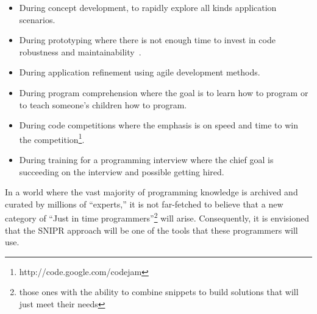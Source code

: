 \begin{itemize}
\item During concept development, to rapidly explore all kinds application scenarios.
\item During prototyping where there is not enough time to invest in 
    code robustness and maintainability~\cite{Brandt:2008wi, Ncube:2008fm, Brandt:2009jb}. 
\item During application refinement using agile development methods. 
\item During program comprehension where the goal is to learn how to program or 
    to teach someone's children how to program.  
\item During code competitions where the emphasis is on speed and time to win 
    the competition\footnote{http://code.google.com/codejam}.
\item During training for a programming interview where the chief goal is succeeding on the 
    interview and possible getting hired.
\end{itemize}

In a world where the vast majority of programming knowledge is archived and curated by millions of ``experts,'' it is not far-fetched to believe that a new category of ``Just in time programmers''\footnote{those ones with the ability to combine snippets to build solutions that will just meet their needs} will arise. Consequently, it is envisioned that the \uppercase{SnipR} approach will be one of the tools that these programmers will use. 



